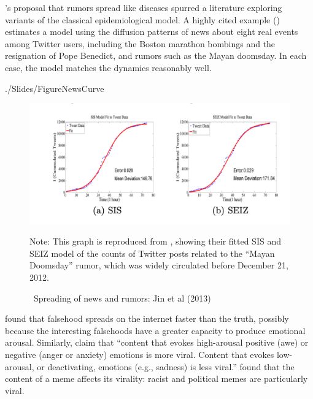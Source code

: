 \cite{daley1964epidemics}'s proposal that rumors spread like diseases spurred a literature exploring variants of the classical epidemiological model.  A highly cited example (\cite{jin2013epidemiological}) 
estimates a model using the diffusion patterns of news about eight real events among Twitter users, including the Boston marathon bombings  and the resignation of Pope Benedict, and rumors such as the Mayan doomsday.  In each case, the model matches the dynamics reasonably well. 

\begin{verbatimwrite}{./Slides/FigureNewsCurve}
  \begin{figure}[!ht] \centering  %
    \caption{ ~Spreading of news and rumors: Jin et al (2013)}\nocite{jin2013epidemiological}
    \label{fig:news_curve}
    \centerline{\includegraphics[width=\textwidth]{./figures/Doomsday}}
    \begin{flushleft}{\footnotesize Note: This graph is reproduced from \cite{jin2013epidemiological}, showing their fitted SIS and SEIZ model of the counts of Twitter posts related to the ``Mayan Doomsday'' rumor, which was widely circulated before December 21, 2012.}
    \end{flushleft}
  \end{figure}
\end{verbatimwrite}%

\ifInBook{}{

}
 found that falsehood spreads on the internet faster than the truth, possibly because the interesting falsehoods have a greater capacity to produce emotional arousal.  Similarly,  claim that ``content that evokes high-arousal positive (awe) or negative (anger or anxiety) emotions is more viral. Content that evokes low-arousal, or deactivating, emotions (e.g., sadness) is less viral.''  found that the content of a meme affects its virality: racist and political memes are particularly viral.


